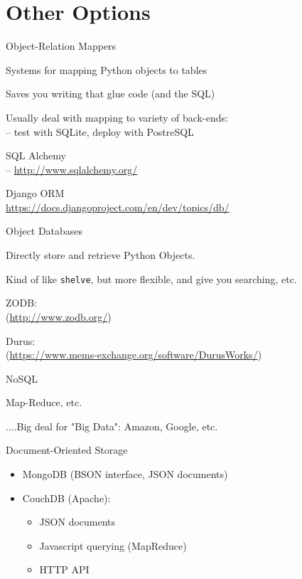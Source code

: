 \documentclass{beamer}
\begin{document}
\section{Other Options}

\begin{frame}[fragile]{Object-Relation Mappers}

\vfill
{\Large Systems for mapping Python objects to tables}

\vfill
{\Large Saves you writing that glue code (and the SQL) }

\vfill
{\Large Usually deal with mapping to variety of back-ends:\\
 -- test with SQLite, deploy with PostreSQL}

\vfill
{\Large  SQL Alchemy}\\ 
 -- \url{http://www.sqlalchemy.org/}

\vfill
{\Large Django ORM}\\
\url{https://docs.djangoproject.com/en/dev/topics/db/}

\end{frame} 


\begin{frame}[fragile]{Object Databases}

{\Large Directly store and retrieve Python Objects.}

\vfill
{\Large Kind of like \verb|shelve|, but more flexible, and give you searching, etc.}

\vfill
{\Large ZODB:}\\
(\url{http://www.zodb.org/})

\vfill
{\Large Durus:}\\
(\url{https://www.mems-exchange.org/software/DurusWorks/})

\end{frame} 

\begin{frame}[fragile]{NoSQL}

{\Large Map-Reduce, etc.}

\vfill
{\Large....Big deal for "Big Data": Amazon, Google, etc.}

\vfill
{\Large Document-Oriented Storage}
 
{\large
\begin{itemize}
  \item MongoDB (BSON interface, JSON documents)
  \item CouchDB (Apache):
  \begin{itemize}
    \item  JSON documents
    \item  Javascript querying (MapReduce)  
    \item  HTTP API  
  \end{itemize}
\end{itemize}
}

\end{frame} 
\end{document}

